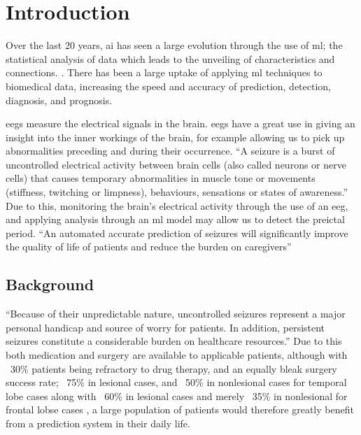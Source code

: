 \documentclass[12pt]{article}
\begin{document}
\section{Introduction}


Over the last 20 years, \acrfull{ai} has seen a large evolution through the use of \acrfull{ml}; the statistical analysis of data which leads to the unveiling of characteristics and connections. \cite{awad2015efficient}. There has been a large uptake of applying \acrshort{ml} techniques to biomedical data, increasing the speed and accuracy of prediction, detection, diagnosis, and prognosis. 

\acrfull{eegs} measure the electrical signals in the brain. \acrshort{eegs} have a great use in giving an insight into the inner workings of the brain, for example allowing us to pick up abnormalities preceding and during their occurrence. ``A seizure is a burst of uncontrolled electrical activity between brain cells (also called neurons or nerve cells) that causes temporary abnormalities in muscle tone or movements (stiffness, twitching or limpness), behaviours, sensations or states of awareness.'' \cite{johnHopkinsTypesOfSeizures} Due to this, monitoring the brain's electrical activity through the use of an \acrshort{eeg}, and applying analysis through an \acrshort{ml} model may allow us to detect the preictal period. ``An automated accurate prediction of seizures will significantly improve the quality of life of patients and reduce the burden on caregivers'' \cite{acharya2018automated}


\subsection{Background}

``Because of their unpredictable nature, uncontrolled seizures represent a major personal handicap and source of worry for patients. In addition, persistent seizures constitute a considerable burden on healthcare resources.'' \cite{assi2017towards} Due to this both medication and surgery are available to applicable patients, although with ~30\% patients being refractory to drug therapy, and an equally bleak surgery success rate; ~75\% in lesional cases, and ~50\% in nonlesional cases for temporal lobe cases along with ~60\% in lesional cases and merely ~35\% in nonlesional for frontal lobse cases \cite{assi2017towards}, a large population of patients would therefore greatly benefit from a prediction system in their daily life. 
\end{document}
